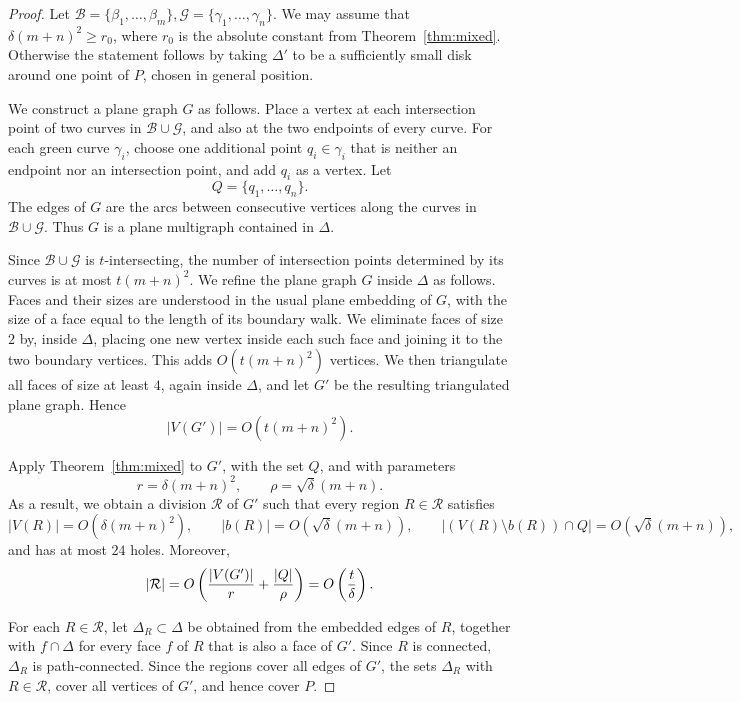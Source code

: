 \documentclass[11pt]{article}
\theoremstyle{plain}
\theoremstyle{definition}
\theoremstyle{remark}
\begin{document}
\begin{proof}
Let $\mathcal B=\{\beta_1,\ldots,\beta_m\}, \mathcal G=\{\gamma_1,\ldots,\gamma_n\}$. We may assume that \(\delta(m+n)^2\ge r_0\), where \(r_0\) is the absolute
constant from Theorem~\ref{thm:mixed}. Otherwise the statement follows by taking \(\Delta'\) to be a sufficiently
small disk around one point of \(P\), chosen in general position.

We construct a plane graph \(G\) as follows. Place a vertex at each
intersection point of two curves in \(\mathcal B\cup\mathcal G\), and also at
the two endpoints of every curve. For each green curve \(\gamma_i\), choose
one additional point \(q_i\in\gamma_i\) that is neither an endpoint nor an
intersection point, and add \(q_i\) as a vertex. Let
\[
Q=\{q_1,\ldots,q_n\}.
\]
The edges of \(G\) are the arcs between consecutive vertices along the curves
in \(\mathcal B\cup\mathcal G\). Thus \(G\) is a plane multigraph contained
in \(\Delta\).   

Since \(\mathcal B\cup\mathcal G\) is \(t\)-intersecting, the number of
intersection points determined by its curves is at most \(t(m+n)^2\). We
refine the plane graph \(G\) inside \(\Delta\) as follows.  Faces and their
sizes are understood in the usual plane embedding of \(G\), with the size of a
face equal to the length of its boundary walk. We eliminate
faces of size \(2\) by, inside $\Delta$, placing one new vertex inside each such face and
joining it to the two boundary vertices. This adds \(O(t(m+n)^2)\) vertices.
We then triangulate all faces of size at least \(4\), again inside
\(\Delta\), and let \(G'\) be the resulting triangulated plane graph. Hence
\[
|V(G')|=O(t(m+n)^2).
\]



Apply Theorem~\ref{thm:mixed} to \(G'\), with the set \(Q\), and with
parameters
\[
r=\delta(m+n)^2,\qquad \rho=\sqrt\delta(m+n).
\]
As a result, we obtain a division \(\mathcal R\) of \(G'\) such that every region
\(R\in\mathcal R\) satisfies
\[
|V(R)|=O(\delta(m+n)^2),\qquad
|b(R)|=O(\sqrt\delta(m+n)),\qquad
|(V(R)\setminus b(R))\cap Q|=O(\sqrt\delta(m+n)),
\]
and has at most \(24\) holes. Moreover,
\[
|\mathcal R|
=
O\left({|V(G')|\over r}+{|Q|\over \rho}\right)
=
O\left({t\over\delta}\right).
\]

For each \(R\in\mathcal R\), let \(\Delta_R\subset \Delta\) be obtained from
the embedded edges of \(R\), together with \(f\cap\Delta\) for every face
\(f\) of \(R\) that is also a face of \(G'\). Since \(R\) is connected,
\(\Delta_R\) is path-connected. Since the regions cover all edges of \(G'\),
the sets \(\Delta_R\) with \(R\in\mathcal R\), cover all vertices of \(G'\), and
hence cover \(P\).  


\end{proof}
\end{document}
